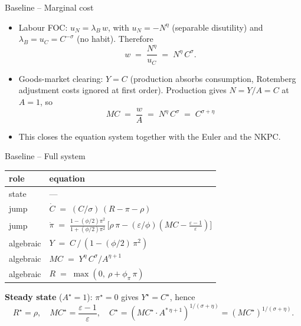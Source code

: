 \documentclass[11pt,aspectratio=169]{beamer}
\begin{document}
\begin{frame}{Baseline -- Marginal cost}

\begin{itemize}

\item Labour FOC: $u_N = \lambda_B\,w$, with $u_N = -N^\eta$ (separable
  disutility) and $\lambda_B = u_C = C^{-\sigma}$ (no habit). Therefore
  \[
  w \;=\; \frac{N^\eta}{u_C} \;=\; N^\eta\,C^\sigma.
  \]

\item Goods-market clearing: $Y=C$ (production absorbs consumption,
  Rotemberg adjustment costs ignored at first order). Production gives
  $N = Y/A = C$ at $A=1$, so
  \[
  \boxed{MC \;=\; \frac{w}{A} \;=\; N^\eta\,C^\sigma \;=\;
  C^{\sigma+\eta}}
  \]

\item This closes the equation system together with the Euler and the
  NKPC.

\end{itemize}

\end{frame}

\begin{frame}{Baseline -- Full system}

\begin{center}
\small
\renewcommand{\arraystretch}{1.4}
\begin{tabular}{ll}
\toprule
role & equation \\
\midrule
state      & --- \\
jump       & $\dot C \;=\; (C/\sigma)\,(R-\pi-\rho)$ \\
jump       & $\dot\pi \;=\; \frac{1-(\phi/2)\pi^2}{1+(\phi/2)\pi^2}\,
              \bigl[\rho\,\pi - (\varepsilon/\phi)(MC - \tfrac{\varepsilon-1}{\varepsilon})\bigr]$ \\
algebraic  & $Y \;=\; C\,/\,(1 - (\phi/2)\,\pi^2)$ \\
algebraic  & $MC \;=\; Y^{\eta}\,C^{\sigma} / A^{\eta+1}$ \\
algebraic  & $R \;=\; \max(0,\ \rho + \phi_\pi\,\pi)$ \\
\bottomrule
\end{tabular}
\end{center}

\medskip

\textbf{Steady state} ($A^\star = 1$): $\pi^\star = 0$ gives $Y^\star = C^\star$, hence
\[
R^\star = \rho, \quad
MC^\star = \frac{\varepsilon-1}{\varepsilon}, \quad
C^\star = (MC^\star \cdot A^{*\,\eta+1})^{1/(\sigma+\eta)} = (MC^\star)^{1/(\sigma+\eta)}.
\]

\end{frame}
\end{document}
